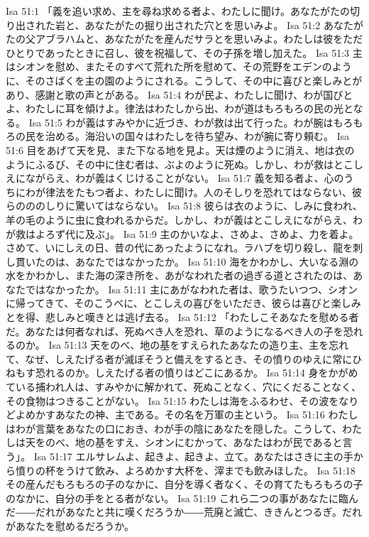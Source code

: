 Isa 51:1  「義を追い求め、主を尋ね求める者よ、わたしに聞け。あなたがたの切り出された岩と、あなたがたの掘り出された穴とを思いみよ。
Isa 51:2  あなたがたの父アブラハムと、あなたがたを産んだサラとを思いみよ。わたしは彼をただひとりであったときに召し、彼を祝福して、その子孫を増し加えた。
Isa 51:3  主はシオンを慰め、またそのすべて荒れた所を慰めて、その荒野をエデンのように、そのさばくを主の園のようにされる。こうして、その中に喜びと楽しみとがあり、感謝と歌の声とがある。
Isa 51:4  わが民よ、わたしに聞け、わが国びとよ、わたしに耳を傾けよ。律法はわたしから出、わが道はもろもろの民の光となる。
Isa 51:5  わが義はすみやかに近づき、わが救は出て行った。わが腕はもろもろの民を治める。海沿いの国々はわたしを待ち望み、わが腕に寄り頼む。
Isa 51:6  目をあげて天を見、また下なる地を見よ。天は煙のように消え、地は衣のようにふるび、その中に住む者は、ぶよのように死ぬ。しかし、わが救はとこしえにながらえ、わが義はくじけることがない。
Isa 51:7  義を知る者よ、心のうちにわが律法をたもつ者よ、わたしに聞け。人のそしりを恐れてはならない、彼らのののしりに驚いてはならない。
Isa 51:8  彼らは衣のように、しみに食われ、羊の毛のように虫に食われるからだ。しかし、わが義はとこしえにながらえ、わが救はよろず代に及ぶ」。
Isa 51:9  主のかいなよ、さめよ、さめよ、力を着よ。さめて、いにしえの日、昔の代にあったようになれ。ラハブを切り殺し、龍を刺し貫いたのは、あなたではなかったか。
Isa 51:10  海をかわかし、大いなる淵の水をかわかし、また海の深き所を、あがなわれた者の過ぎる道とされたのは、あなたではなかったか。
Isa 51:11  主にあがなわれた者は、歌うたいつつ、シオンに帰ってきて、そのこうべに、とこしえの喜びをいただき、彼らは喜びと楽しみとを得、悲しみと嘆きとは逃げ去る。
Isa 51:12  「わたしこそあなたを慰める者だ。あなたは何者なれば、死ぬべき人を恐れ、草のようになるべき人の子を恐れるのか。
Isa 51:13  天をのべ、地の基をすえられたあなたの造り主、主を忘れて、なぜ、しえたげる者が滅ぼそうと備えをするとき、その憤りのゆえに常にひねもす恐れるのか。しえたげる者の憤りはどこにあるか。
Isa 51:14  身をかがめている捕われ人は、すみやかに解かれて、死ぬことなく、穴にくだることなく、その食物はつきることがない。
Isa 51:15  わたしは海をふるわせ、その波をなりどよめかすあなたの神、主である。その名を万軍の主という。
Isa 51:16  わたしはわが言葉をあなたの口におき、わが手の陰にあなたを隠した。こうして、わたしは天をのべ、地の基をすえ、シオンにむかって、あなたはわが民であると言う」。
Isa 51:17  エルサレムよ、起きよ、起きよ、立て。あなたはさきに主の手から憤りの杯をうけて飲み、よろめかす大杯を、滓までも飲みほした。
Isa 51:18  その産んだもろもろの子のなかに、自分を導く者なく、その育てたもろもろの子のなかに、自分の手をとる者がない。
Isa 51:19  これら二つの事があなたに臨んだ――だれがあなたと共に嘆くだろうか――荒廃と滅亡、ききんとつるぎ。だれがあなたを慰めるだろうか。
